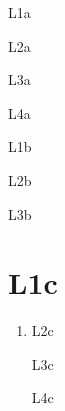 \documentclass[presentation]{beamer}
\author{root}
\date{\today}
\title{}
\begin{document}
\begin{frame}[label={sec:org555ca3f}]{L1a}
\begin{block}{L2a}
\begin{block}{L3a}
\begin{block}{L4a}
\end{block}
\end{block}
\end{block}
\end{frame}
\begin{frame}[label={sec:orgdf27f64}]{L1b}
\begin{block}{L2b}
\begin{block}{L3b}
\end{block}
\end{block}
\end{frame}
\section{L1c}
\label{sec:org17fdc1f}
\begin{enumerate}
\item L2c
\label{sec:orgd354c37}
\begin{frame}[label={sec:orgb030d27}]{L3c}
\begin{block}{L4c}
\end{block}
\end{frame}
\end{enumerate}
\end{document}

